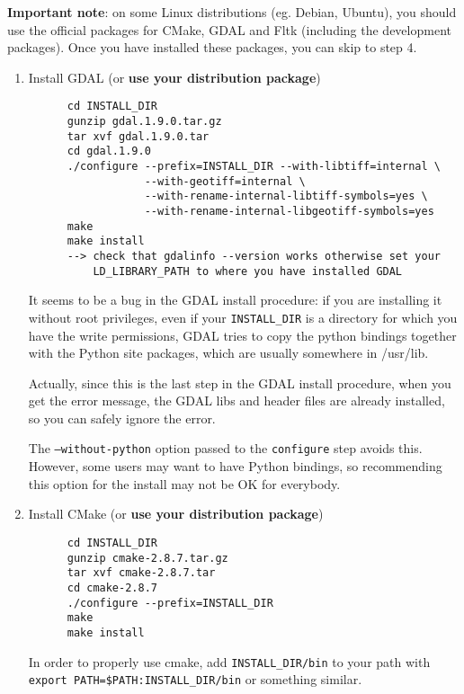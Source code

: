 \textbf{Important note}: on some Linux distributions (eg. Debian, Ubuntu), you should use
the official packages for CMake, GDAL and Fltk (including the development packages). Once you have installed these
packages, you can skip to step 4.

\begin{enumerate}

\item Install GDAL (or \textbf{use your distribution package})
  \begin{verbatim}
      cd INSTALL_DIR
      gunzip gdal.1.9.0.tar.gz
      tar xvf gdal.1.9.0.tar
      cd gdal.1.9.0
      ./configure --prefix=INSTALL_DIR --with-libtiff=internal \
                  --with-geotiff=internal \
                  --with-rename-internal-libtiff-symbols=yes \
                  --with-rename-internal-libgeotiff-symbols=yes
      make
      make install
      --> check that gdalinfo --version works otherwise set your
          LD_LIBRARY_PATH to where you have installed GDAL
  \end{verbatim}

It seems to be a bug in the GDAL install procedure: if you are installing it without root privileges, even if your \texttt{INSTALL\_DIR} is a directory for which you have the write permissions, GDAL tries to copy the python bindings together with the Python site packages, which are usually somewhere in /usr/lib.

Actually, since this is the last step in the GDAL install procedure, when you get the error message, the GDAL libs and header files are already installed, so you can safely ignore the error.

The \texttt{--without-python} option passed to the \texttt{configure} step avoids this. However, some users may want to have Python bindings, so recommending this option for the install may not be OK for everybody.

\item Install CMake (or \textbf{use your distribution package})
  \begin{verbatim}
      cd INSTALL_DIR
      gunzip cmake-2.8.7.tar.gz
      tar xvf cmake-2.8.7.tar
      cd cmake-2.8.7
      ./configure --prefix=INSTALL_DIR
      make
      make install
  \end{verbatim}
      In order to properly use cmake, add \texttt{INSTALL\_DIR/bin} to
      your path with \texttt{export PATH=\$PATH:INSTALL\_DIR/bin} or
      something similar.


\end{enumerate}
